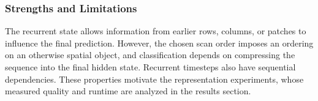 \subsubsection{Strengths and Limitations}

The recurrent state allows information from earlier rows, columns, or patches to influence the final prediction. However, the chosen scan order imposes an ordering on an otherwise spatial object, and classification depends on compressing the sequence into the final hidden state. Recurrent timesteps also have sequential dependencies. These properties motivate the representation experiments, whose measured quality and runtime are analyzed in the results section.

